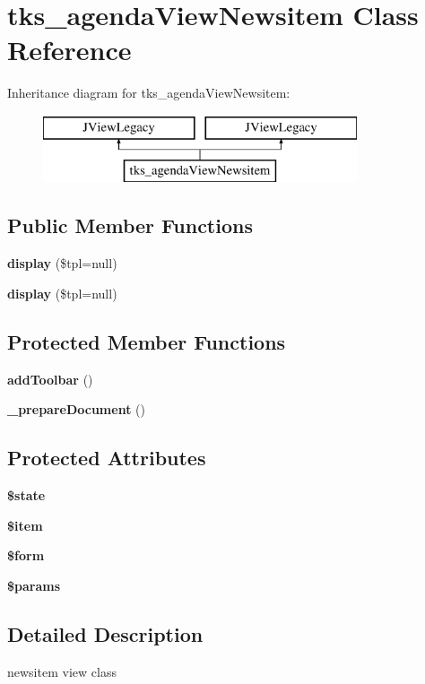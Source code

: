 \section{tks\+\_\+agenda\+View\+Newsitem Class Reference}
\label{classtks__agenda_view_newsitem}
Inheritance diagram for tks\+\_\+agenda\+View\+Newsitem\+:\begin{figure}[H]
\begin{center}
\leavevmode
\includegraphics[height=2.000000cm]{classtks__agenda_view_newsitem}
\end{center}
\end{figure}
\subsection*{Public Member Functions}
\begin{DoxyCompactItemize}
\item 
\textbf{ display} (\$tpl=null)
\item 
\textbf{ display} (\$tpl=null)
\end{DoxyCompactItemize}
\subsection*{Protected Member Functions}
\begin{DoxyCompactItemize}
\item 
\textbf{ add\+Toolbar} ()
\item 
\textbf{ \+\_\+prepare\+Document} ()
\end{DoxyCompactItemize}
\subsection*{Protected Attributes}
\begin{DoxyCompactItemize}
\item 
\textbf{ \$state}
\item 
\textbf{ \$item}
\item 
\textbf{ \$form}
\item 
\textbf{ \$params}
\end{DoxyCompactItemize}


\subsection{Detailed Description}
newsitem view class

